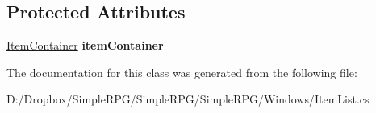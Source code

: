 \subsection*{Protected Attributes}
\begin{DoxyCompactItemize}
\item 
\hypertarget{class_simple_r_p_g_1_1_windows_1_1_item_list_a85d047fe8d365e9be51af2f59dc47782}{\hyperlink{class_simple_r_p_g_1_1_item_container}{Item\+Container} {\bfseries item\+Container}}\label{class_simple_r_p_g_1_1_windows_1_1_item_list_a85d047fe8d365e9be51af2f59dc47782}

\end{DoxyCompactItemize}


The documentation for this class was generated from the following file\+:\begin{DoxyCompactItemize}
\item 
D\+:/\+Dropbox/\+Simple\+R\+P\+G/\+Simple\+R\+P\+G/\+Simple\+R\+P\+G/\+Windows/Item\+List.\+cs\end{DoxyCompactItemize}
